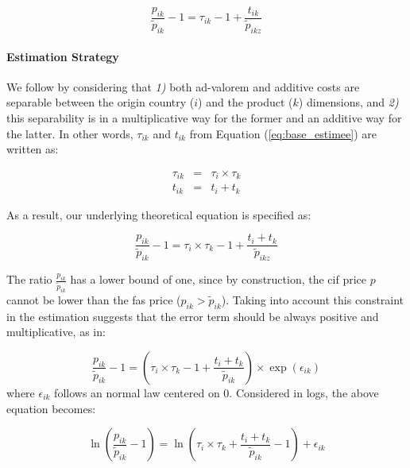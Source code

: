 \documentclass[a4paper,11pt]{article}
\begin{document}
\begin{equation*}
\frac{p_{ik}}{\widetilde{p}_{ik}} -1 = \tau_{ik} -1 +\frac{t_{ik}}{ \widetilde{p}_{ikz}} \label{eq:base_estimee}
\end{equation*}

\paragraph{Estimation Strategy} We follow \citet{Irrazabal_2015} by considering that \textit{1)} both ad-valorem and additive costs are separable between the origin country ($i$) and the product ($k$) dimensions, and \textit{2)} this separability is in a multiplicative way for the former and an additive way for the latter. In other words, $\tau_{ik}$ and $t_{ik}$ from Equation (\ref{eq:base_estimee}) are written as:

\begin{eqnarray}
\tau_{ik} &=& \tau_{i} \times \tau_{k} \label{eq:ad-valorem}\\
t_{ik} &=& t_{i} + t_{k} \label{eq:add}
\end{eqnarray}

\noindent As a result, our underlying theoretical equation is specified as:

\begin{equation*}
\frac{p_{ik}}{\widetilde{p}_{ik}}-1 =\tau_{i} \times \tau_{k} -1 +\frac{t_{i} + t_{k}}{ \widetilde{p}_{ikz}} \label{eq:theory_equation}
\end{equation*}

The ratio $\frac{p_{ik}}{\widetilde{p}_{ik}}$ has a lower bound of one, since by construction, the cif price $p$ cannot be lower than the fas price ($p_{ik}>\widetilde{p}_{ik}$). Taking into account this constraint in the estimation suggests that the error term should be always positive and multiplicative, as in:

\begin{equation*}
\frac{p_{ik}}{\widetilde{p}_{ik}}-1 =\left(\tau_{i} \times \tau_{k} -1+\frac{t_{i} + t_{k}}{\widetilde{p}_{ik}} \right)\times \exp(\epsilon_{ik})
\end{equation*}
\noindent where $\epsilon_{ik}$ follows an normal law centered on 0. Considered in logs, the above equation becomes:

\begin{equation}
\ln\left(\frac{p_{ik}}{\widetilde{p}_{ik}}-1 \right)= \ln \left(\tau_{i} \times \tau_{k}+\frac{t_{i} + t_{k}}{\widetilde{p}_{ik}}-1 \right) + \epsilon_{ik} \label{eq:equation0}
\end{equation}
\end{document}
